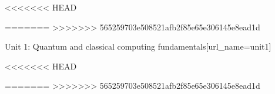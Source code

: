 %
%
%


\newcommand{\be}{\begin{equation}}
\newcommand{\ee}{\end{equation}}

\newcommand{\bea}{\begin{eqnarray}}
\newcommand{\eea}{\end{eqnarray}}
<<<<<<< HEAD

\usepackage{amsmath}
\newcommand{\ket}[1]{|{#1}\rangle}
\newcommand{\bra}[1]{\langle{#1}|}
\newcommand{\braket}[2]{\langle{#1}|{#2}\rangle}
\newcommand{\ketbra}[2]{|{#1}\rangle\!\langle{#2}|}
=======
>>>>>>> 565259703e508521afb2f85e65e306145e8ead1d

\newenvironment{problem}{\begin{enumerate}%
		\renewcommand{\makelabel}[1]{%
  		    {\bf \TheType\refstepcounter{mycnt}\themycnt:~\hfill}%
		    \ifthenelse{\equal{##1}{}}{}{%
    		({\bf ##1})}%
			}}%
                        {\end{enumerate}}%

\newcommand{\mattwoc}[4]{\left[
	\begin{array}{cc}{#1}&{#2}\\{#3}&{#4}\end{array}\right]}


\def\<{\langle}
\def\>{\rangle}

\begin{edXchapter}{Unit 1: Quantum and classical computing fundamentals}[url_name=unit1]


% 


% 





<<<<<<< HEAD


=======
>>>>>>> 565259703e508521afb2f85e65e306145e8ead1d
% 
% 
% 
% 
% 
% 
% 
% 
% 
% 

% 

\end{edXchapter}
